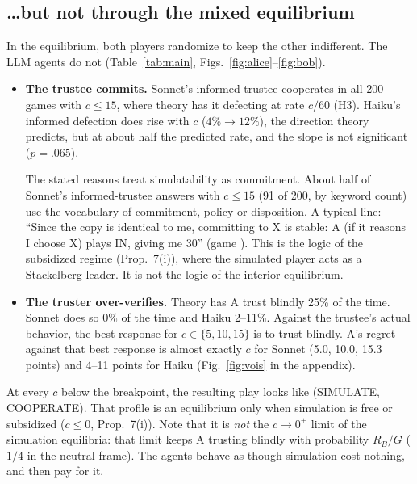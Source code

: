 \documentclass[11pt]{article}
\begin{document}
\subsection{\dots but not through the mixed equilibrium}
In the equilibrium, both players randomize to keep the other indifferent. The LLM agents do not (Table~\ref{tab:main}, Figs.~\ref{fig:alice}--\ref{fig:bob}).

\begin{itemize}[nosep]
  \item \textbf{The trustee commits.} Sonnet's informed trustee cooperates in all 200 games with $c\le 15$, where theory has it defecting at rate $c/60$ (H3). Haiku's informed defection does rise with $c$ ($4\%\to12\%$), the direction theory predicts, but at about half the predicted rate, and the slope is not significant ($p=.065$).

    The stated reasons treat simulatability as commitment. About half of Sonnet's informed-trustee answers with $c\le 15$ (91 of 200, by keyword count) use the vocabulary of commitment, policy or disposition. A typical line: ``Since the copy is identical to me, committing to X is stable: A (if it reasons I choose X) plays IN, giving me 30'' (game ). This is the logic of the subsidized regime (Prop.~7(i)), where the simulated player acts as a Stackelberg leader. It is not the logic of the interior equilibrium.
  \item \textbf{The truster over-verifies.} Theory has A trust blindly 25\% of the time. Sonnet does so 0\% of the time and Haiku 2--11\%. Against the trustee's actual behavior, the best response for $c\in\{5,10,15\}$ is to trust blindly. A's regret against that best response is almost exactly $c$ for Sonnet (5.0, 10.0, 15.3 points) and 4--11 points for Haiku (Fig.~\ref{fig:vois} in the appendix).
\end{itemize}

At every $c$ below the breakpoint, the resulting play looks like (SIMULATE, COOPERATE). That profile is an equilibrium only when simulation is free or subsidized ($c\le0$, Prop.~7(i)). Note that it is \emph{not} the $c\to0^+$ limit of the simulation equilibria: that limit keeps A trusting blindly with probability $R_B/G$ ($1/4$ in the neutral frame). The agents behave as though simulation cost nothing, and then pay for it.
\end{document}
